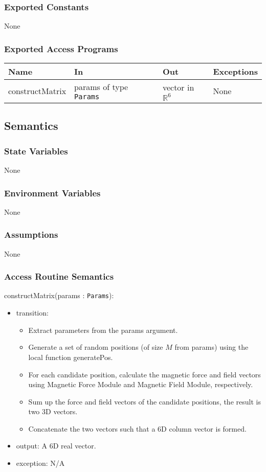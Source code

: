 \documentclass[12pt, titlepage]{article}
\begin{document}
\subsubsection{Exported Constants}
None

\subsubsection{Exported Access Programs}
\begin{center}
\begin{tabular}{p{3cm} p{4cm} p{4cm} p{3cm}}
\hline
\textbf{Name} & \textbf{In} & \textbf{Out} & \textbf{Exceptions} \\
\hline
constructMatrix & params of type \texttt{Params} & vector in $\mathbb{R}^6$ & None \\
\hline
\end{tabular}
\end{center}

\subsection{Semantics}

\subsubsection{State Variables}
None

\subsubsection{Environment Variables}
None

\subsubsection{Assumptions}
None 

\subsubsection{Access Routine Semantics}

\noindent constructMatrix(params : \texttt{Params}):
\begin{itemize}
\item transition: 
\begin{itemize}
  \item Extract parameters from the params argument. 
  \item Generate a set of random positions (of size $M$ from params) using the local function generatePos.
  \item For each candidate position, calculate the magnetic force and field vectors using Magnetic Force Module and Magnetic Field Module, respectively. 
  \item Sum up the force and field vectors of the candidate positions, the result is two 3D vectors. 
  \item Concatenate the two vectors such that a 6D column vector is formed.
\end{itemize}
\item output: A 6D real vector. 
\item exception: N/A
\end{itemize}
\end{document}
